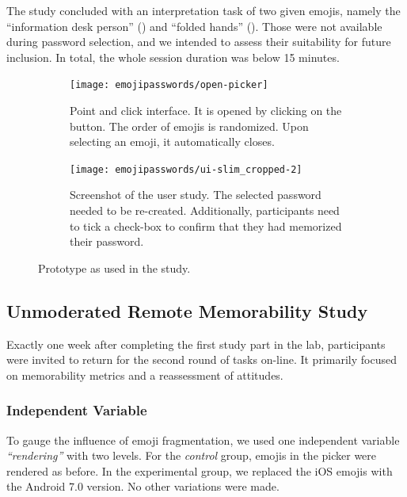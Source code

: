 The study concluded with an interpretation task of two given emojis, namely the ``information desk person'' () and ``folded hands'' (). Those were not available during password selection, and we intended to assess their suitability for future inclusion. In total, the whole session duration was below 15 minutes.

\begin{figure}
	\centering
	\begin{subfigure}[t]{0.45\textwidth}
		\texttt{[image: emojipasswords/open-picker]}
		\caption{\label{fig:emojipasswords:ui-open-picker} Point and click interface. It is opened by clicking on the  button. The order of emojis is randomized. Upon selecting an emoji, it automatically closes.}
	\end{subfigure}
	\hspace*{0.2cm}
	\begin{subfigure}[t]{0.45\textwidth}
		\texttt{[image: emojipasswords/ui-slim\_cropped-2]}
		\caption{\label{fig:emojipasswords:policy-memo-instruction} Screenshot of the user study. The selected password needed to be re-created. Additionally, participants need to tick a check-box to confirm that they had memorized their password.}
	\end{subfigure}
	\caption{\label{fig:emojipasswords:prototype} Prototype as used in the study.}
\end{figure}

\subsection{Unmoderated Remote Memorability Study}
Exactly one week after completing the first study part in the lab, participants were invited to return for the second round of tasks on-line. It primarily focused on memorability metrics and a reassessment of attitudes. 
\subsubsection{Independent Variable}
To gauge the influence of emoji fragmentation, we used one independent variable \textit{``rendering''} with two levels. For the \textit{control} group, emojis in the picker were rendered as before. In the experimental group, we replaced the iOS emojis with the Android 7.0 version. No other variations were made. 
